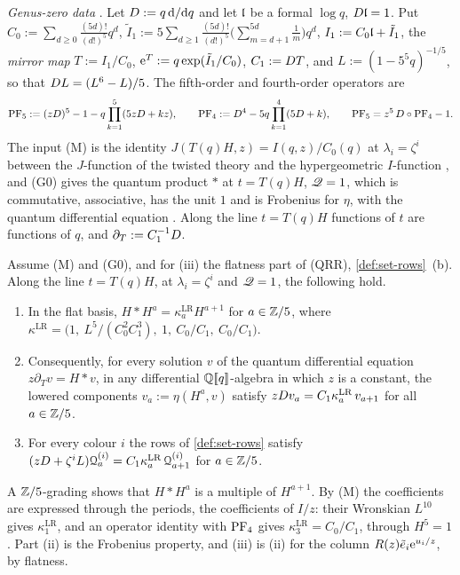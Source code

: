 \emph{Genus-zero data} . Let $D:=q\,\mathrm{d}/\mathrm{d} q$ and let $\mathfrak{l}$ be a formal $\log q$, $D\mathfrak{l}=1$. Put $C_0:=\sum_{d\geq0}\frac{(5d)!}{(d!)^5}q^d$, $\tilde I_1:=5\sum_{d\geq1}\frac{(5d)!}{(d!)^5}\bigl(\sum_{m=d+1}^{5d}\frac1m\bigr)q^d$, $I_1:=C_0\mathfrak{l}+\tilde I_1$, the \emph{mirror map} $T:=I_1/C_0$, $\mathrm{e}^T:=q\exp(\tilde I_1/C_0)$, $C_1:=D T$, and $L:=(1-5^5q)^{-1/5}$, so that $D L=(L^6-L)/5$. The fifth-order and fourth-order operators are
\[
\mathrm{PF}_{5}:=(zD)^5-1-q\prod_{k=1}^5(5zD+kz),\qquad \mathrm{PF}_{4}:=D^4-5q\prod_{k=1}^4(5D+k),\qquad \mathrm{PF}_{5}=z^5\,D\circ\mathrm{PF}_{4}-1 .
\]
The input (M) is the identity $J(T(q)H,z)=I(q,z)/C_0(q)$ at $\lambda_i=\zeta^i$ between the $J$-function of the twisted theory and the hypergeometric $I$-function , and (G0) gives the quantum product $*$ at $t=T(q)H$, $\mathscr{Q}=1$, which is commutative, associative, has the unit $1$ and is Frobenius for $\eta$, with the quantum differential equation . Along the line $t=T(q)H$ functions of $t$ are functions of $q$, and $\partial_T:=C_1^{-1}D$.

\begin{prop}
\label{prop:set-cyclicLR}
Assume (M) and (G0), and for (iii) the flatness part of (QRR), \cref{def:set-rows}~(b). Along the line $t=T(q)H$, at $\lambda_i=\zeta^i$ and $\mathscr{Q}=1$, the following hold.
\begin{enumerate}
\item In the flat basis, $H*H^a=\kappa^{\mathrm{LR}}_aH^{a+1}$ for $a\in\mathbb{Z}/5$, where $\kappa^{\mathrm{LR}}=\bigl(1,\ L^5/(C_0^2C_1^3),\ 1,\ C_0/C_1,\ C_0/C_1\bigr)$.
\item Consequently, for every solution $v$ of the quantum differential equation $z\partial_Tv=H*v$, in any differential $\mathbb{Q}[\![ q ]\!]$-algebra in which $z$ is a constant, the lowered components $v_a:=\eta(H^a,v)$ satisfy $zD v_a=C_1\kappa^{\mathrm{LR}}_a\,v_{a+1}$ for all $a\in\mathbb{Z}/5$.
\item For every colour $i$ the rows of \cref{def:set-rows} satisfy $(zD+\zeta^iL)\mathcal{Q}^{(i)}_a=C_1\kappa^{\mathrm{LR}}_a\,\mathcal{Q}^{(i)}_{a+1}$ for $a\in\mathbb{Z}/5$.
\end{enumerate}
\end{prop}

\begin{sketch}
A $\mathbb{Z}/5$-grading shows that $H*H^a$ is a multiple of $H^{a+1}$. By (M) the coefficients are expressed through the periods, the coefficients of $I/z$: their Wronskian $L^{10}$ gives $\kappa^{\mathrm{LR}}_1$, and an operator identity with $\mathrm{PF}_{4}$ gives $\kappa^{\mathrm{LR}}_3=C_0/C_1$, through $H^5=1$. Part (ii) is the Frobenius property, and (iii) is (ii) for the column $R(z)\tilde e_i\mathrm{e}^{u_i/z}$, by flatness.
\end{sketch}

